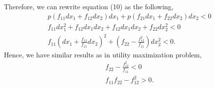 \documentclass[12pt]{article}
\begin{document}
Therefore, we can rewrite equation (10) as the following,
\begin{align}
				&p(f_{11}dx_1 + f_{12}dx_2)dx_1 + p(f_{21}dx_1 + f_{22}dx_2)dx_2 <0\\
				&f_{11}dx_1^{2} + f_{12}dx_1dx_2 + f_{12}dx_1dx_2 + f_{22}dx_2^{2} <0\\
				&f_{11}\left( dx_1 + \frac{f_{12}}{f_{11}}dx_2 \right) ^{2} + 
				\left( f_{22} - \frac{f_{12}^{2}}{f_{11}} \right) dx_2^{2} < 0.
\end{align}
Hence, we have similar results as in utility maximization problem,
\begin{align}
				&f_{22} - \frac{f_{12}^{2}}{f_{11}} <0\\
				&f_{11}f_{22} - f_{12}^{2} > 0.
\end{align}
\end{document}
